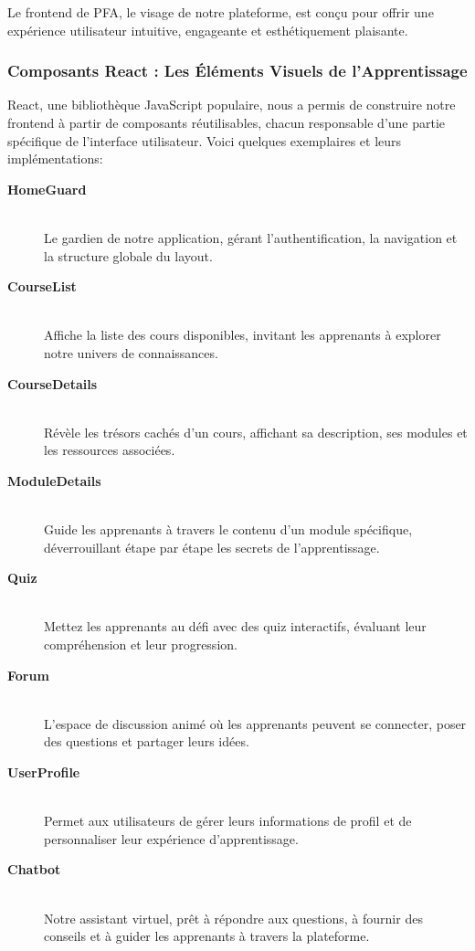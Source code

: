 Le frontend de PFA, le visage de notre plateforme, est conçu pour offrir une expérience utilisateur intuitive, engageante et esthétiquement plaisante.

\subsubsection{Composants React : Les Éléments Visuels de l'Apprentissage}

React, une bibliothèque JavaScript populaire, nous a permis de construire notre frontend à partir de composants réutilisables, chacun responsable d'une partie spécifique de l'interface utilisateur. Voici quelques exemplaires et leurs implémentations:

\begin{description}
    \item[\textbf{HomeGuard}] \hfill \\
    Le gardien de notre application, gérant l'authentification, la navigation et la structure globale du layout.
    
    \item[\textbf{CourseList}] \hfill \\
    Affiche la liste des cours disponibles, invitant les apprenants à explorer notre univers de connaissances.
    
    \item[\textbf{CourseDetails}] \hfill \\
    Révèle les trésors cachés d'un cours, affichant sa description, ses modules et les ressources associées.
    
    \item[\textbf{ModuleDetails}] \hfill \\
    Guide les apprenants à travers le contenu d'un module spécifique, déverrouillant étape par étape les secrets de l'apprentissage.
    
    \item[\textbf{Quiz}] \hfill \\
    Mettez les apprenants au défi avec des quiz interactifs, évaluant leur compréhension et leur progression.
    
    \item[\textbf{Forum}] \hfill \\
    L'espace de discussion animé où les apprenants peuvent se connecter, poser des questions et partager leurs idées.
    
    \item[\textbf{UserProfile}] \hfill \\
    Permet aux utilisateurs de gérer leurs informations de profil et de personnaliser leur expérience d'apprentissage.

    \item[\textbf{Chatbot}] \hfill \\
    Notre assistant virtuel, prêt à répondre aux questions, à fournir des conseils et à guider les apprenants à travers la plateforme.
\vfill
\end{description}

